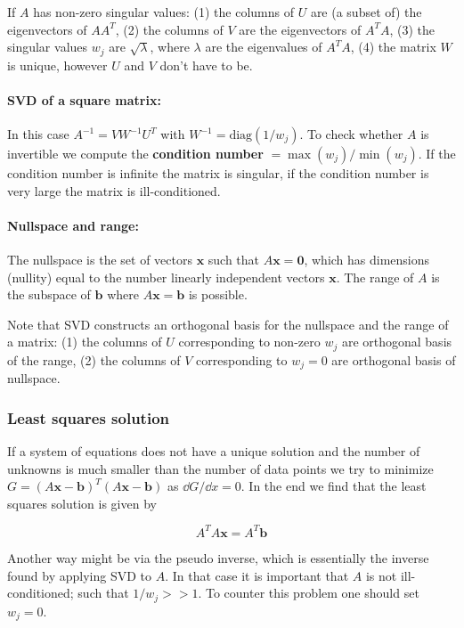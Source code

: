 \documentclass[a4paper]{article}
\begin{document}
If $A$ has non-zero singular values: (1) the columns of $U$ are (a subset of) the eigenvectors of $AA^T$, (2) the columns of $V$ are the eigenvectors of $A^TA$, (3) the singular values $w_j$ are $\sqrt{\lambda}$, where $\lambda$ are the eigenvalues of $A^TA$, (4) the matrix $W$ is unique, however $U$ and $V$ don't have to be.

\paragraph{SVD of a square matrix:} In this case $A^{-1}=VW^{-1}U^T$ with $W^{-1}=\text{diag}(1/w_j)$. To check whether $A$ is invertible we compute the \textbf{condition number} $=\max(w_j)/\min(w_j)$. If the condition number is infinite the matrix is singular, if the condition number is very large the matrix is ill-conditioned.

\paragraph{Nullspace and range:} The nullspace is the set of vectors $\mathbf{x}$ such that $A\mathbf{x}=\mathbf{0}$, which has dimensions (nullity) equal to the number linearly independent vectors $\mathbf{x}$. The range of $A$ is the subspace of $\mathbf{b}$ where $A\mathbf{x}=\mathbf{b}$ is possible.

\bigskip

Note that SVD constructs an orthogonal basis for the nullspace and the range of a matrix: (1) the columns of $U$ corresponding to non-zero $w_j$ are orthogonal basis of the range, (2) the columns of $V$ corresponding to $w_j=0$ are orthogonal basis of nullspace.

\subsubsection{Least squares solution}

If a system of equations does not have a unique solution and the number of unknowns is much smaller than the number of data points we try to minimize $G=(A\mathbf{x}-\mathbf{b})^T(A\mathbf{x}-\mathbf{b})$ as $\dd{G}/\dd{x}=0$. In the end we find that the least squares solution is given by

\begin{equation*}
    A^TA\mathbf{x}=A^T\mathbf{b}
\end{equation*}

Another way might be via the pseudo inverse, which is essentially the inverse found by applying SVD to $A$. In that case it is important that $A$ is not ill-conditioned; such that $1/w_j>>1$. To counter this problem one should set $w_j=0$.
\end{document}
